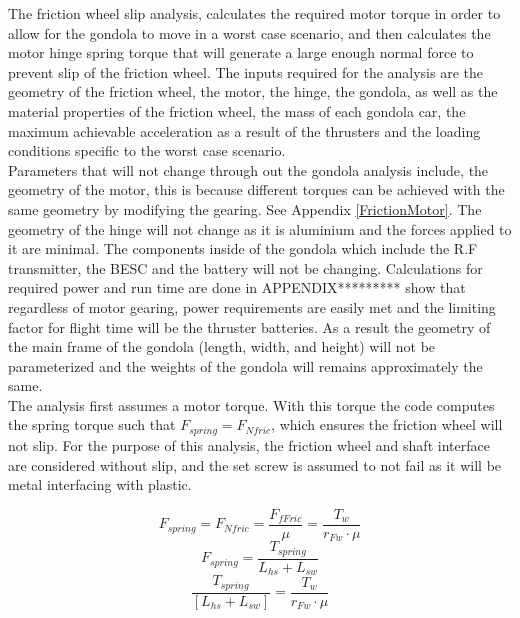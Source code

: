 \documentclass[../main.tex]{subfiles}
\begin{document}
The friction wheel slip analysis, calculates the required motor torque in order to allow for the gondola to move in a worst case scenario, and then calculates the motor hinge spring torque that will generate a large enough normal force to prevent slip of the friction wheel. The inputs required for the analysis are the geometry of the friction wheel, the motor, the hinge, the gondola, as well as the material properties of the friction wheel, the mass of each gondola car, the maximum achievable acceleration as a result of the thrusters and the loading conditions specific to the worst case scenario. \\


Parameters that will not change through out the gondola analysis include, the geometry of the motor, this is because different torques can be achieved with the same geometry by modifying the gearing. See Appendix \ref{FrictionMotor}. The geometry of the hinge will not change as it is aluminium and the forces applied to it are minimal. The components inside of the gondola which include the R.F transmitter, the BESC and the battery will not be changing. Calculations for required power and run time are done in APPENDIX********* show that regardless of motor gearing, power requirements are easily met and the limiting factor for flight time will be the thruster batteries. As a result the geometry of the main frame of the gondola (length, width, and height) will not be parameterized and the weights of the gondola will remains approximately the same. \\

The analysis first assumes a motor torque. With this torque the code computes the spring torque such that $F_{spring} = F_{Nfric}$, which ensures the friction wheel will not slip. For the purpose of this analysis, the friction wheel and shaft interface are considered without slip, and the set screw is assumed to not fail as it will be metal interfacing with plastic.

\begin{equation}
F_{spring} = F_{Nfric} = \frac{F_{fFric}}{\mu} = \frac{T_w}{r_{Fw}\cdot{}\mu}
\end{equation}
\begin{equation}
F_{spring} = \frac{T_{spring}}{L_{hs}+L_{sw}}
\end{equation}
\begin{equation}
\frac{T_{spring}}{[L_{hs}+L_{sw}]} = \frac{T_w}{r_{Fw}\cdot{}\mu}
\end{equation}
\end{document}
